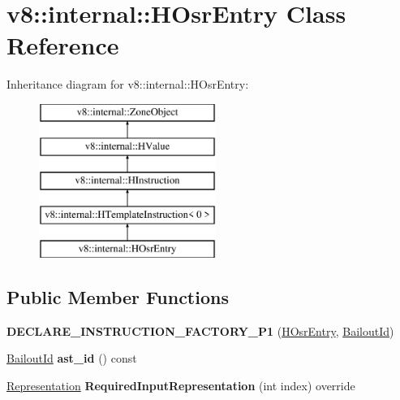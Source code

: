 \hypertarget{classv8_1_1internal_1_1_h_osr_entry}{}\section{v8\+:\+:internal\+:\+:H\+Osr\+Entry Class Reference}
\label{classv8_1_1internal_1_1_h_osr_entry}
Inheritance diagram for v8\+:\+:internal\+:\+:H\+Osr\+Entry\+:\begin{figure}[H]
\begin{center}
\leavevmode
\includegraphics[height=5.000000cm]{classv8_1_1internal_1_1_h_osr_entry}
\end{center}
\end{figure}
\subsection*{Public Member Functions}
\begin{DoxyCompactItemize}
\item 
{\bfseries D\+E\+C\+L\+A\+R\+E\+\_\+\+I\+N\+S\+T\+R\+U\+C\+T\+I\+O\+N\+\_\+\+F\+A\+C\+T\+O\+R\+Y\+\_\+\+P1} (\hyperlink{classv8_1_1internal_1_1_h_osr_entry}{H\+Osr\+Entry}, \hyperlink{classv8_1_1internal_1_1_bailout_id}{Bailout\+Id})\hypertarget{classv8_1_1internal_1_1_h_osr_entry_a94897454611e87fa8243e0fe55ee9584}{}\label{classv8_1_1internal_1_1_h_osr_entry_a94897454611e87fa8243e0fe55ee9584}

\item 
\hyperlink{classv8_1_1internal_1_1_bailout_id}{Bailout\+Id} {\bfseries ast\+\_\+id} () const \hypertarget{classv8_1_1internal_1_1_h_osr_entry_ad1b19f638db6330f58adcbc9e8f24b11}{}\label{classv8_1_1internal_1_1_h_osr_entry_ad1b19f638db6330f58adcbc9e8f24b11}

\item 
\hyperlink{classv8_1_1internal_1_1_representation}{Representation} {\bfseries Required\+Input\+Representation} (int index) override\hypertarget{classv8_1_1internal_1_1_h_osr_entry_a238f30bd61047d3947d3fc7ff1c7ceb4}{}\label{classv8_1_1internal_1_1_h_osr_entry_a238f30bd61047d3947d3fc7ff1c7ceb4}

\end{DoxyCompactItemize}
